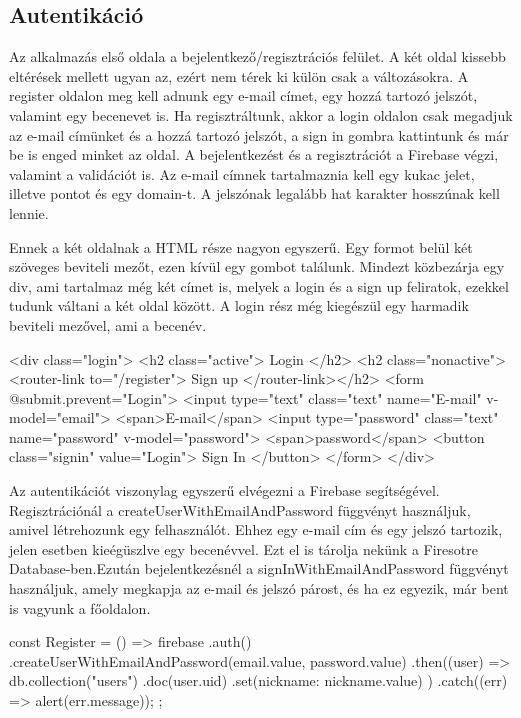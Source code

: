 \subsection{Autentikáció}
Az alkalmazás első oldala a bejelentkező/regisztrációs felület. A két oldal kissebb eltérések mellett ugyan az, ezért nem térek ki külön csak a változásokra. A register oldalon meg kell adnunk egy e-mail címet, egy hozzá tartozó jelszót, valamint egy becenevet is. Ha regisztráltunk, akkor a login oldalon csak megadjuk az e-mail címünket és a hozzá tartozó jelszót, a sign in gombra kattintunk és már be is enged minket az oldal. A bejelentkezést és a regisztrációt a Firebase végzi, valamint a validációt is. Az e-mail címnek tartalmaznia kell egy kukac jelet, illetve pontot és egy domain-t. A jelszónak legalább hat karakter hosszúnak kell lennie.

Ennek a két oldalnak a HTML része nagyon egyszerű. Egy formot belül két szöveges beviteli mezőt, ezen kívül egy gombot találunk. Mindezt közbezárja egy div, ami tartalmaz még két címet is, melyek a login és a sign up feliratok, ezekkel tudunk váltani a két oldal között. A login rész még kiegészül egy harmadik beviteli mezővel, ami a becenév.

\begin{python}
<div class="login">
  <h2 class="active"> Login </h2>
  <h2 class="nonactive"><router-link to="/register"> Sign up </router-link></h2> 
  <form @submit.prevent="Login">
    <input type="text" class="text" name="E-mail" v-model="email">
    <span>E-mail</span>
    <input type="password" class="text" name="password" v-model="password">
    <span>password</span>
    <button class="signin" value="Login">
      Sign In
    </button>
  </form>
</div>
\end{python}

Az autentikációt viszonylag egyszerű elvégezni a Firebase segítségével. Regisztrációnál a createUserWithEmailAndPassword függvényt használjuk, amivel létrehozunk egy felhasználót. Ehhez egy e-mail cím és egy jelszó tartozik, jelen esetben kieégüszlve egy becenévvel. Ezt el is tárolja nekünk a Firesotre Database-ben.Ezután bejelentkezésnél a signInWithEmailAndPassword függvényt használjuk, amely megkapja az e-mail és jelszó párost, és ha ez egyezik, már bent is vagyunk a főoldalon.

\begin{python}
const Register = () => {
      firebase
        .auth()
        .createUserWithEmailAndPassword(email.value, password.value)
        .then((user) => {
          db.collection("users")
            .doc(user.uid)
            .set({nickname: nickname.value})
        })
        .catch((err) => alert(err.message));
    };
\end{python}

